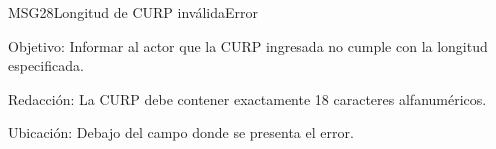 \begin{mensaje}{MSG28}{Longitud de CURP inválida}{Error}
	\item [Objetivo:] Informar al actor que la CURP ingresada no cumple con la longitud especificada.
	\item[Redacción:] La CURP debe contener exactamente 18 caracteres alfanuméricos.
	\item [Ubicación:] Debajo del campo donde se presenta el error.
\end{mensaje}